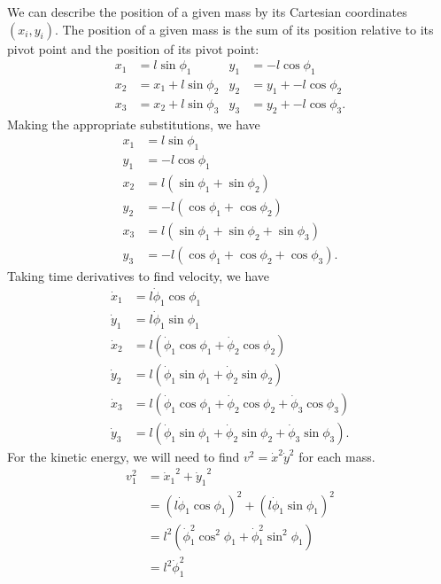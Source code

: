 \documentclass{article}
\begin{document}
\begin{appendices}
    We can describe the position of a given mass by its Cartesian coordinates
    $(x_i, y_i)$.  The position of a given mass is the sum of its position
    relative to its pivot point and the position of its pivot point:
    \begin{align}
        x_1 &= l\sin\phi_1     & y_1 &= -l\cos\phi_1 \\
        x_2 &= x_1+l\sin\phi_2 & y_2 &= y_1 + -l\cos\phi_2 \\
        x_3 &= x_2+l\sin\phi_3 & y_3 &= y_2 + -l\cos\phi_3.
    \end{align}
    Making the appropriate substitutions, we have
    \begin{align}
        x_1 &= l\sin\phi_1     \\
        y_1 &= -l\cos\phi_1 \\
        x_2 &= l(\sin\phi_1+\sin\phi_2)  \\
        y_2 &= -l(\cos\phi_1+\cos\phi_2) \\
        x_3 &= l(\sin\phi_1+\sin\phi_2+\sin\phi_3)  \\
        y_3 &= -l(\cos\phi_1+\cos\phi_2+\cos\phi_3).
    \end{align}
    Taking time derivatives to find velocity, we have
    \begin{align}
        \dot x_1 &= l\dot\phi_1\cos\phi_1 \\
        \dot y_1 &= l\dot\phi_1\sin\phi_1 \\
        \dot x_2 &= l(\dot\phi_1\cos\phi_1+\dot\phi_2\cos\phi_2) \\
        \dot y_2 &= l(\dot\phi_1\sin\phi_1+\dot\phi_2\sin\phi_2) \\
        \dot x_3 &= l(\dot\phi_1\cos\phi_1+\dot\phi_2\cos\phi_2
            +\dot\phi_3\cos\phi_3) \\
        \dot y_3 &= l(\dot\phi_1\sin\phi_1+\dot\phi_2\sin\phi_2
            +\dot\phi_3\sin\phi_3).
    \end{align}
    For the kinetic energy, we will need to find $v^2={\dot x}^2{\dot y}^2$ for
    each mass. 
    \begin{align}
        v_1^2 &= {\dot x_1}^2+{\dot y_1}^2 \\
        &= (l\dot\phi_1\cos\phi_1)^2
            +(l\dot\phi_1\sin\phi_1)^2 \\
        &= l^2(\dot\phi_1^2\cos^2\phi_1+\dot\phi_1^2\sin^2\phi_1) \\
        &= l^2\dot\phi_1^2 \\\\

\end{align}
\end{appendices}
\end{document}
